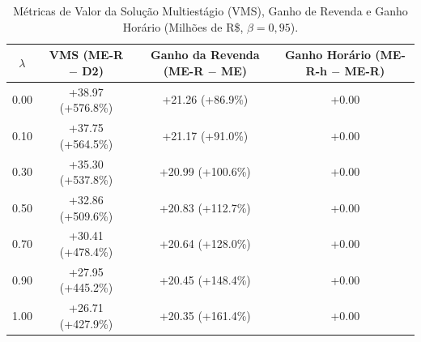 \begin{table}[t]
\centering
\caption{Métricas de Valor da Solução Multiestágio (VMS), Ganho de Revenda e Ganho Horário (Milhões de R\$, $\beta = 0{,}95$).}
\label{tab:metricas_valor}
\begin{tabular}{cccc}
\hline
$\lambda$ & VMS (ME-R $-$ D2) & Ganho da Revenda (ME-R $-$ ME) & Ganho Horário (ME-R-h $-$ ME-R) \\
\hline
  0.00 & +38.97 (+576.8\%) & +21.26 (+86.9\%) & +0.00 \\
  0.10 & +37.75 (+564.5\%) & +21.17 (+91.0\%) & +0.00 \\
  0.30 & +35.30 (+537.8\%) & +20.99 (+100.6\%) & +0.00 \\
  0.50 & +32.86 (+509.6\%) & +20.83 (+112.7\%) & +0.00 \\
  0.70 & +30.41 (+478.4\%) & +20.64 (+128.0\%) & +0.00 \\
  0.90 & +27.95 (+445.2\%) & +20.45 (+148.4\%) & +0.00 \\
  1.00 & +26.71 (+427.9\%) & +20.35 (+161.4\%) & +0.00 \\
\hline
\end{tabular}
\end{table}
